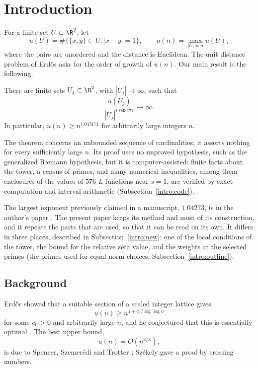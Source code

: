 \section{Introduction}\label{intro:section}
For a finite set $U\subset\R^2$, let
\[
 u(U)=\#\{\{x,y\}\subset U:|x-y|=1\},\qquad
 u(n)=\max_{|U|=n}u(U),
\]
where the pairs are unordered and the distance is Euclidean. The unit
distance problem of Erd\H{o}s \cite{Erdos1946} asks for the order of
growth of $u(n)$. Our main result is the following.

\begin{theorem}\label{thm:main}
There are finite sets $U_j\subset\R^2$, with $|U_j|\to\infty$, such that
\[
 \frac{u(U_j)}{|U_j|^{1.043171}}\longrightarrow\infty.
\]
In particular, $u(n)\ge n^{1.043171}$ for arbitrarily large integers $n$.
\end{theorem}

The theorem concerns an unbounded sequence of cardinalities; it asserts
nothing for every sufficiently large $n$. Its proof uses no unproved
hypothesis, such as the generalized Riemann hypothesis, but it is
computer-assisted: finite facts about the tower, a census of primes, and
many numerical inequalities, among them enclosures of the values of $576$
$L$-functions near $s=1$, are verified by exact computation and interval
arithmetic (Subsection~\ref{intro:code}).

The largest exponent previously claimed in a manuscript, $1.04273$, is in
the author's paper \cite{Naslund04273}. The present paper keeps its
method and most of its construction, and it repeats the parts that are
used, so that it can be read on its own. It differs in three places,
described in Subsection~\ref{intro:new}: one of the local conditions of
the tower, the bound for the relative zeta value, and the weights at the
selected primes (the primes used for equal-norm choices,
Subsection~\ref{intro:outline}).

\subsection{Background}\label{intro:background}
Erd\H{o}s \cite{Erdos1946} showed that a suitable section of a scaled
integer lattice gives
\[
 u(n)\ge n^{1+c_0/\log\log n}
\]
for some $c_0>0$ and arbitrarily large $n$, and he conjectured that this is
essentially optimal \cite{Erdos1946,Erdos1994}. The best upper bound,
\[
 u(n)=O(n^{4/3}),
\]
is due to Spencer, Szemer\'edi and Trotter
\cite{SpencerSzemerediTrotter1984}; Sz\'ekely \cite{Szekely1997} gave a
proof by crossing numbers.

